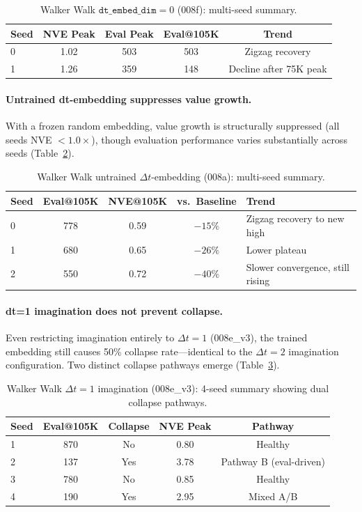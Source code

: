 \documentclass[letterpaper]{article}
\begin{document}
\begin{table}[h]
\centering
\caption{Walker Walk $\texttt{dt\_embed\_dim}=0$ (008f): multi-seed summary.}
\label{tab:walker_008f}
\begin{tabular}{lcccc}
\toprule
Seed & NVE Peak & Eval Peak & Eval@105K & Trend \\
\midrule
0 & 1.02 & 503 & 503 & Zigzag recovery \\
1 & 1.26 & 359 & 148 & Decline after 75K peak \\
\bottomrule
\end{tabular}
\end{table}

\paragraph{Untrained dt-embedding suppresses value growth.}

With a frozen random embedding, value growth is structurally suppressed (all seeds NVE $< 1.0\times$), though evaluation performance varies substantially across seeds (Table~\ref{tab:walker_008a}).

\begin{table}[h]
\centering
\caption{Walker Walk untrained $\Delta t$-embedding (008a): multi-seed summary.}
\label{tab:walker_008a}
\begin{tabular}{lcccl}
\toprule
Seed & Eval@105K & NVE@105K & vs.\ Baseline & Trend \\
\midrule
0 & 778 & 0.59 & $-15\%$ & Zigzag recovery to new high \\
1 & 680 & 0.65 & $-26\%$ & Lower plateau \\
2 & 550 & 0.72 & $-40\%$ & Slower convergence, still rising \\
\bottomrule
\end{tabular}
\end{table}

\paragraph{dt=1 imagination does not prevent collapse.}

Even restricting imagination entirely to $\Delta t=1$ (008e\_v3), the trained embedding still causes 50\% collapse rate---identical to the $\Delta t=2$ imagination configuration. Two distinct collapse pathways emerge (Table~\ref{tab:walker_008e}).

\begin{table}[h]
\centering
\caption{Walker Walk $\Delta t=1$ imagination (008e\_v3): 4-seed summary showing dual collapse pathways.}
\label{tab:walker_008e}
\begin{tabular}{lcccc}
\toprule
Seed & Eval@105K & Collapse & NVE Peak & Pathway \\
\midrule
1 & 870 & No & 0.80 & Healthy \\
2 & 137 & Yes & 3.78 & Pathway B (eval-driven) \\
3 & 780 & No & 0.85 & Healthy \\
4 & 190 & Yes & 2.95 & Mixed A/B \\
\bottomrule
\end{tabular}
\end{table}
\end{document}

